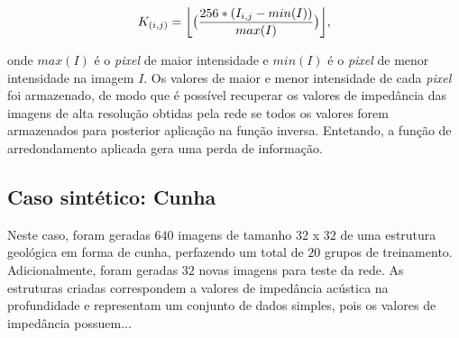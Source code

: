\begin{equation}
 K_{(i,j)} = \floor*{\big( \frac{256*(I_{i,j} - min(I))}{max(I)} \big)},
\label{eqn:norm_im}
 \end{equation}

onde $max(I)$ é o \textit{pixel} de maior intensidade e $min(I)$ é o \textit{pixel} de menor intensidade
na imagem $I$. Os valores de maior e menor intensidade de cada \textit{pixel} foi armazenado, de modo que é
possível recuperar os valores de impedância das imagens de alta resolução obtidas pela rede
se todos os valores forem armazenados para posterior aplicação na função inversa. Entetando,
a função de arredondamento aplicada gera uma perda de informação.

\subsection{Caso sintético: Cunha}
Neste caso, foram geradas $640$ imagens de tamanho $32$ x $32$ de uma estrutura geológica em forma
de cunha, perfazendo um total de $20$ grupos de treinamento. Adicionalmente, foram geradas $32$
novas imagens para teste da rede. As estruturas criadas correspondem a valores de impedância
acústica na profundidade e representam um conjunto de dados simples, pois os valores
de impedância possuem... 

